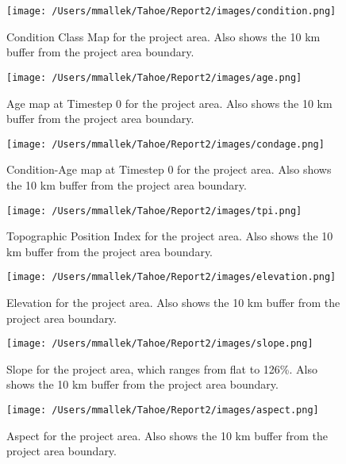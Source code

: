 \begin{figure}[!htbp]
\centering
\texttt{[image: /Users/mmallek/Tahoe/Report2/images/condition.png]}
\caption{Condition Class Map for the project area. Also shows the 10 km buffer from the project area boundary.} 
\label{conditionmap}
\end{figure}

\begin{figure}[htbp]
\centering
\texttt{[image: /Users/mmallek/Tahoe/Report2/images/age.png]}
\caption{Age map at Timestep 0 for the project area. Also shows the 10 km buffer from the project area boundary.} 
\label{agemap}
\end{figure}

\begin{figure}[htbp]
\centering
\texttt{[image: /Users/mmallek/Tahoe/Report2/images/condage.png]}
\caption{Condition-Age map at Timestep 0 for the project area. Also shows the 10 km buffer from the project area boundary.} 
\label{condagemap}
\end{figure}

\begin{figure}[htbp]
\centering
\texttt{[image: /Users/mmallek/Tahoe/Report2/images/tpi.png]}
\caption{Topographic Position Index for the project area. Also shows the 10 km buffer from the project area boundary.} 
\label{tpimap}
\end{figure}

\begin{figure}[htbp]
\centering
\texttt{[image: /Users/mmallek/Tahoe/Report2/images/elevation.png]}
\caption{Elevation for the project area. Also shows the 10 km buffer from the project area boundary.} 
\label{elevationmap}
\end{figure}

\begin{figure}[htbp]
\centering
\texttt{[image: /Users/mmallek/Tahoe/Report2/images/slope.png]}
\caption{Slope for the project area, which ranges from flat to 126\%. Also shows the 10 km buffer from the project area boundary.} 
\label{slopemap}
\end{figure}

\begin{figure}[htbp]
\centering
\texttt{[image: /Users/mmallek/Tahoe/Report2/images/aspect.png]}
\caption{Aspect for the project area. Also shows the 10 km buffer from the project area boundary.} 
\label{aspectmap}
\end{figure}

